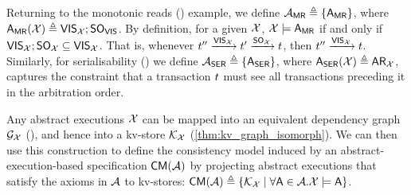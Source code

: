 Returning to the monotonic reads (\MR) example, 
we define $\mathcal{A}_{\mathsf{MR}} \triangleq \{\mathsf{A}_{\mathsf{MR}}\}$, where $\mathsf{A}_{\mathsf{MR}}(\mathcal{X}) \triangleq \mathsf{VIS}_{\mathcal{X}} ; \mathsf{SO}_{\mathsf{VIS}}$. 
By definition, for a given $\mathcal{X}$, $\mathcal{X} \models \mathsf{A}_{\mathsf{MR}}$ if and only 
if $\mathsf{VIS}_{\mathcal{X}} ; \mathsf{SO}_{\mathcal{X}} \subseteq \mathsf{VIS}_{\mathcal{X}}$. 
That is, whenever $t'' \xrightarrow{\mathsf{VIS}_{\mathcal{X}}} t' \xrightarrow{\mathsf{SO}_{\mathcal{X}}} t $, 
then $t'' \xrightarrow{\mathsf{VIS}_{\mathcal{X}}} t$.
Similarly, for serialisability (\SER) we define $\mathcal{A}_{\mathsf{SER}} \triangleq \{ \mathsf{A}_{\mathsf{SER}} \}$, where $\mathsf{A}_{\mathsf{SER}}(\mathcal{X}) \triangleq \mathsf{AR}_{\mathcal{X}}$, 
captures the constraint that a transaction $t$ must see all transactions
preceding it in the arbitration order.

Any abstract executions $\mathcal{X}$ can be mapped 
into an equivalent dependency graph $\mathcal{G}_{\mathcal{X}}$ (\citet{laws}), and hence into a kv-store 
$\mathcal{K}_{\mathcal{X}}$ (\cref{thm:kv_graph_isomorph}). 
We can then use this construction to define the consistency model induced by an abstract-execution-based specification 
$\CMs(\Ax)$ by projecting abstract executions that satisfy the axioms in $\mathcal{A}$ to kv-stores: 
$\CMs(\Ax) \defeq \{ \hh_{\aexec} \mid \forall \A \in \Ax. \aexec \models \A \}$. 

